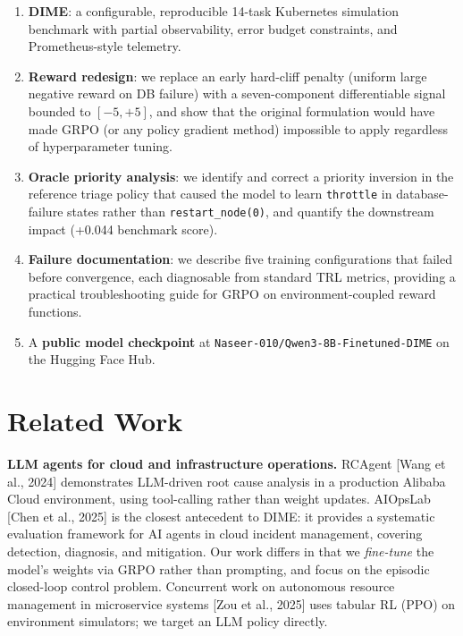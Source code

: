 \documentclass{article}
\begin{document}
\begin{enumerate}
    \item \textbf{DIME}: a configurable, reproducible 14-task Kubernetes simulation
    benchmark with partial observability, error budget constraints, and
    Prometheus-style telemetry.

    \item \textbf{Reward redesign}: we replace an early hard-cliff penalty (uniform
    large negative reward on DB failure) with a seven-component differentiable signal bounded to $[-5, +5]$, and
    show that the original formulation would have made GRPO (or any policy gradient
    method) impossible to apply regardless of hyperparameter tuning.

    \item \textbf{Oracle priority analysis}: we identify and correct a priority
    inversion in the reference triage policy that caused the model to learn
    \texttt{throttle} in database-failure states rather than \texttt{restart\_node(0)},
    and quantify the downstream impact (+0.044 benchmark score).

    \item \textbf{Failure documentation}: we describe five training configurations that
    failed before convergence, each diagnosable from standard TRL metrics, providing a
    practical troubleshooting guide for GRPO on environment-coupled reward functions.

    \item A \textbf{public model checkpoint} at
    \texttt{Naseer-010/Qwen3-8B-Finetuned-DIME} on the Hugging Face Hub.
\end{enumerate}

\section{Related Work}

\textbf{LLM agents for cloud and infrastructure operations.} RCAgent [Wang et al.,
2024] demonstrates LLM-driven root cause analysis in a production Alibaba Cloud
environment, using tool-calling rather than weight updates. AIOpsLab [Chen et al.,
2025] is the closest antecedent to DIME: it provides a systematic evaluation framework
for AI agents in cloud incident management, covering detection, diagnosis, and
mitigation. Our work differs in that we \textit{fine-tune} the model's weights via
GRPO rather than prompting, and focus on the episodic closed-loop control problem.
Concurrent work on autonomous resource management in microservice systems [Zou et al.,
2025] uses tabular RL (PPO) on environment simulators; we target an LLM policy directly.
\end{document}
